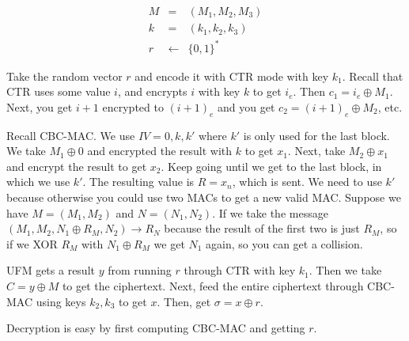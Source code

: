 \documentclass[psamsfonts]{amsart}
\begin{document}
\begin{eqnarray}
  M &=& (M_1, M_2, M_3) \\
  k &=& (k_1, k_2, k_3) \\
  r &\leftarrow& \{0,1\}^*
\end{eqnarray}

Take the random vector $r$ and encode it with CTR mode with key $k_1$. Recall that CTR uses some value $i$, and encrypts $i$ with key $k$ to get $i_{e}$. Then $c_1 = i_{e} \oplus M_1$. Next, you get $i+1$ encrypted to $(i+1)_{e}$ and you get $c_2 = (i+1)_e \oplus M_2$, etc.

Recall CBC-MAC. We use $IV = 0, k, k'$ where $k'$ is only used for the last block. We take $M_1 \oplus 0$  and encrypted the result with $k$ to get $x_1$. Next, take $M_2 \oplus x_1$ and encrypt the result to get $x_2$. Keep going until we get to the last block, in which we use $k'$. The resulting value is $R = x_n$, which is sent. We need to use $k'$ because otherwise you could use two MACs to get a new valid MAC. Suppose we have $M = (M_1, M_2)$ and $N = (N_1, N_2)$. If we take the message $(M_1, M_2, N_1 \oplus R_M, N_2) \rightarrow R_N$ because the result of the first two is just $R_M$, so if we XOR $R_M$ with $N_1 \oplus R_M$ we get $N_1$ again, so you can get a collision.

UFM gets a result $y$ from running $r$ through CTR with key $k_1$. Then we take $C = y \oplus M$ to get the ciphertext. Next, feed the entire ciphertext through CBC-MAC using keys $k_2, k_3$ to get $x$. Then, get $\sigma = x \oplus r$.

Decryption is easy by first computing CBC-MAC and getting $r$.
\end{document}
